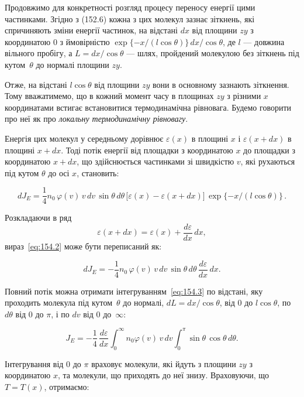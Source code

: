 Продовжимо для конкретності розгляд процесу переносу енергії цими частинками.
Згідно з (152.6) кожна з цих молекул зазнає зіткнень, які спричиняють зміни
енергії частинок, на відстані $dx$ від площини $zy$ з координатою 0 з
ймовірністю $\exp\{-x/(l\cos\theta)\}\, dx/\cos\theta$, де $l$ — довжина
вільного пробігу, а $L = dx/\cos\theta$ — шлях, пройдений молекулою без
зіткнень під кутом~$\theta$ до нормалі площини $zy$.

Отже, на відстані $l \cos\theta$ від площини $zy$ вони в основному зазнають
зіткнення. Тому вважатимемо, що в кожний момент часу в площинах $zy$ з різними
$x$ координатами встигає встановитися термодинамічна рівновага. Будемо говорити
про неї як про \emph{локальну термодинамічну рівновагу}.

Енергія цих молекул у середньому дорівнює $\varepsilon(x)$ в площині $x$ і
$\varepsilon(x+dx)$ в площині $x+dx$. Тоді потік енергії від площадки з
координатою $x$ до площадки з координатою $x+dx$, що здійснюється частинками зі
швидкістю $v$, які рухаються під кутом $\theta$ до осі $x$, становить:

\begin{equation}
	dJ_E = \frac{1}{4} n_0\, \varphi(v)\, v\, dv\, \sin\theta\, d\theta\,
	\bigl[ \varepsilon(x) - \varepsilon(x+dx) \bigr]\,
	\exp\{-x/(l\cos\theta)\}\, .
	\label{eq:154.2}
\end{equation}

Розкладаючи в ряд
\[
	\varepsilon(x+dx)=\varepsilon(x)+\frac{d\varepsilon}{dx}\,dx,
\]
вираз~\eqref{eq:154.2} може бути переписаний як:

\begin{equation}
	dJ_E = -\frac{1}{4} n_0\, \varphi(v)\, v\, dv\, \sin\theta\, d\theta\,
	\frac{d\varepsilon}{dx}\, dx.
	\label{eq:154.3}
\end{equation}

Повний потік можна отримати інтегруванням~\eqref{eq:154.3} по відстані, яку
проходить молекула під кутом~$\theta$ до нормалі, $dL = dx/\cos\theta$, від 0 до
$l\cos\theta$, по $d\theta$ від $0$ до $\pi$, і по $dv$ від $0$ до~$\infty$:

\begin{equation}
	J_E = -\frac{1}{4}\, \frac{d\varepsilon}{dx}
	\int_0^\infty n_0 \varphi(v)\, v\, dv
	\int_0^\pi \sin\theta\, \cos\theta\, d\theta.
	\label{eq:154.4}
\end{equation}

Інтегрування від 0 до $\pi$ враховує молекули, які йдуть з площини $zy$ з
координатою $x$, та молекули, що приходять до неї знизу. Враховуючи, що
$T = T(x)$, отримаємо:

